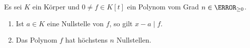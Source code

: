 \begin{corollary} \label{cor:polyRoots}
 Es sei $K$ ein Körper und $0 ≠ f \in K[t]$ ein Polynom vom Grad $n \in \N_{\geq 0}$.
 \begin{enumerate}
 \item Ist $a \in K$ eine Nullstelle von $f$, so gilt $x-a \mid f$.
 \item Das Polynom $f$ hat höchstens $n$ Nullstellen.
 \end{enumerate}
\end{corollary}
%  


